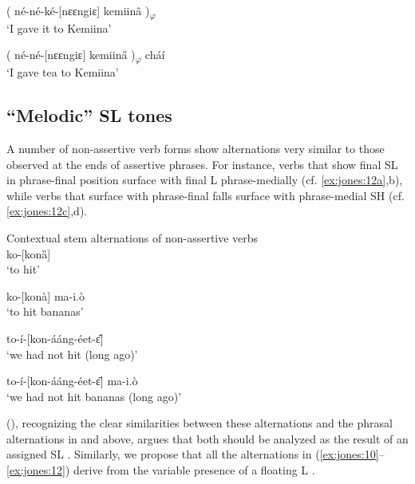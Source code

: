 \documentclass[output=paper,newtxmath,modfonts,nonflat,hidelinks]{langsci/langscibook}
\begin{document}
\ex\label{ex:jones:11b}
{( né-né-ké-[nɛɛngiɛ] kemiinâ )\textsubscript{$\varphi $}}\\
\glt ‘I gave it to Kemiina’    

\ex\label{ex:jones:11c}
{( né-né-[nɛɛngiɛ] kemiin\H{a} )\textsubscript{$\varphi $} cháí}\\
\glt ‘I gave tea to Kemiina’  
\z
\z

\subsection{“Melodic” SL tones}\label{sec:jones:4.3}

A number of non-assertive verb forms show alternations very similar to those observed at the ends of assertive phrases. For instance, verbs that show final SL in phrase-final position surface with final L phrase-medially (cf. \ref{ex:jones:12a},b), while verbs that surface with phrase-final falls surface with phrase-medial SH (cf. \ref{ex:jones:12c},d).

\ea\label{ex:jones:12}
{Contextual stem alternations of non-assertive verbs} \\
\ea\label{ex:jones:12a}
{ko-[konȁ]} \\
\glt ‘to hit’

\ex\label{ex:jones:12b}
{ko-[kon\`a] ma-i.\`o}\\
\glt ‘to hit bananas’

\ex\label{ex:jones:12c}
{to-í-[kon-ááng-éet-\^ɛ]}\\
\glt ‘we had not hit (long ago)’

\ex\label{ex:jones:12d}
{to-í-[kon-ááng-éet-\H{ɛ}] ma-i.\`o} \\
\glt ‘we had not hit bananas (long ago)’
\z
\z

\citeauthor{Roberts-Kohno2000} (\citeyear{Roberts-Kohno2000,Roberts-Kohno2014}), recognizing the clear similarities between these alternations and the phrasal alternations in  and  above, argues that both should be analyzed as the result of an assigned SL . Similarly, we propose that all the alternations in (\ref{ex:jones:10}--\ref{ex:jones:12}) derive from the variable presence of a floating L .
\end{document}

